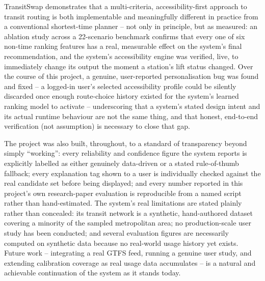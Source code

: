 \documentclass[12pt,a4paper]{report}
\begin{document}
TransitSwap demonstrates that a multi-criteria, accessibility-first approach to transit routing is
both implementable and meaningfully different in practice from a conventional shortest-time planner
-- not only in principle, but as measured: an ablation study across a 22-scenario benchmark confirms
that every one of six non-time ranking features has a real, measurable effect on the system's final
recommendation, and the system's accessibility engine was verified, live, to immediately change its
output the moment a station's lift status changed. Over the course of this project, a genuine,
user-reported personalisation bug was found and fixed -- a logged-in user's selected accessibility
profile could be silently discarded once enough route-choice history existed for the system's
learned ranking model to activate -- underscoring that a system's stated design intent and its
actual runtime behaviour are not the same thing, and that honest, end-to-end verification (not
assumption) is necessary to close that gap.

The project was also built, throughout, to a standard of transparency beyond simply ``working'':
every reliability and confidence figure the system reports is explicitly labelled as either
genuinely data-driven or a stated rule-of-thumb fallback; every explanation tag shown to a user is
individually checked against the real candidate set before being displayed; and every number
reported in this project's own research-paper evaluation is reproducible from a named script rather
than hand-estimated. The system's real limitations are stated plainly rather than concealed: its
transit network is a synthetic, hand-authored dataset covering a minority of the sampled
metropolitan area; no production-scale user study has been conducted; and several evaluation
figures are necessarily computed on synthetic data because no real-world usage history yet exists.
Future work -- integrating a real GTFS feed, running a genuine user study, and extending calibration
coverage as real usage data accumulates -- is a natural and achievable continuation of the system as
it stands today.

\end{document}
